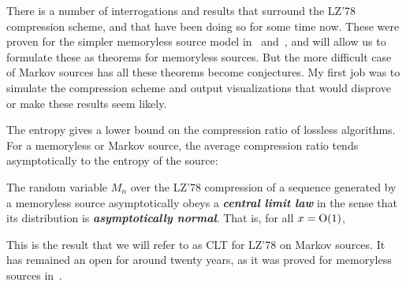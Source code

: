     There is a number of interrogations and results that surround
    the LZ'78 compression scheme, and that have been doing so for 
    some time now. These were proven for the simpler memoryless
    source model in~\cite{louchard_average_1995} 
    and~\cite{jacquet_limiting_2014}, and
    will allow us to formulate these as 
    theorems for memoryless sources. But the more difficult case
    of Markov sources has all these theorems become conjectures.
    My first job was to simulate the compression scheme and output visualizations
    that would disprove or make these results seem likely.

    

    \begin{prop}
        \label{prop:lowerbound}
        The entropy gives a lower bound on the compression 
    ratio of lossless algorithms. For a memoryless or Markov source, the average compression ratio
    tends asymptotically to the entropy of the source:
    \end{prop}

    \begin{theo}
        The random variable $M_n$ over the LZ'78 compression of a sequence 
        generated by a memoryless source asymptotically obeys a
        \emph{\bfseries central limit law} in the
        sense that its distribution is \emph{\bfseries asymptotically normal}.
        That is, for all $x = \grando(1)$,
        
    \end{theo}

    \begin{rmk}
        \label{rmk:clt}
        This is the result that we will refer to as CLT 
        for LZ'78 on Markov sources. It has remained an open
        for around twenty years, as it was proved for 
        memoryless sources in~\cite{jacquet_average_2001}.
    \end{rmk}

